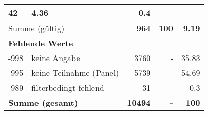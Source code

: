 \begin{longtable}{lXrrr}
       \num{42} &
       \num[round-mode=places,round-precision=2]{4.36} &
         \num[round-mode=places,round-precision=2]{0.4} \\
     \midrule
     \multicolumn{2}{l}{Summe (gültig)} &
       \textbf{\num{964}} &
     \textbf{\num{100}} &
       \textbf{\num[round-mode=places,round-precision=2]{9.19}} \\
     \multicolumn{5}{l}{\textbf{Fehlende Werte}}\\
       -998 &
       keine Angabe &
         \num{3760} &
        - &
         \num[round-mode=places,round-precision=2]{35.83} \\
       -995 &
       keine Teilnahme (Panel) &
         \num{5739} &
        - &
         \num[round-mode=places,round-precision=2]{54.69} \\
       -989 &
       filterbedingt fehlend &
         \num{31} &
        - &
         \num[round-mode=places,round-precision=2]{0.3} \\
     \midrule
     \multicolumn{2}{l}{\textbf{Summe (gesamt)}} &
          \textbf{\num{10494}} &
        \textbf{-} &
        \textbf{\num{100}} \\
     \bottomrule
     \end{longtable}
     

